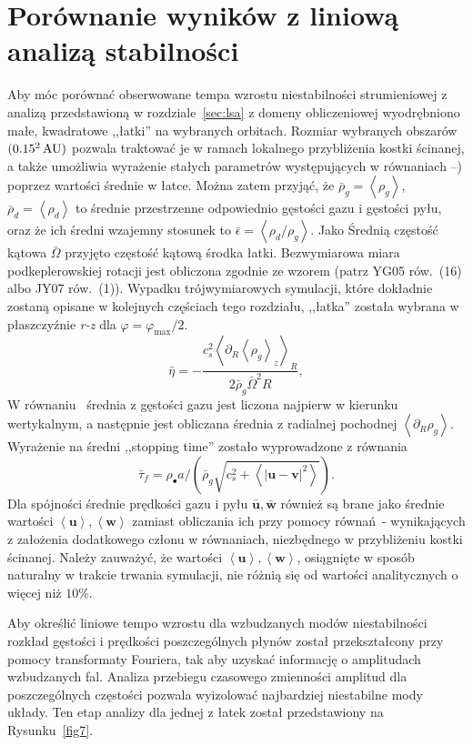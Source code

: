 \section{Porównanie wyników z liniową analizą stabilności}
Aby móc porównać obserwowane tempa wzrostu niestabilności strumieniowej z
analizą przedstawioną w rozdziale~\ref{sec:lsa} z domeny obliczeniowej
wyodrębniono małe, kwadratowe ,,łatki'' na wybranych orbitach. Rozmiar wybranych
obszarów $(0.15^2\hbox{$\thinspace\textrm{AU}$})$ pozwala traktować je w ramach lokalnego przybliżenia
kostki ścinanej, a także umożliwia wyrażenie stałych parametrów występujących w
równaniach --) poprzez wartości średnie w łatce.
Można zatem przyjąć, że $\bar{\rho}_g = \left<\rho_g\right>$, $\bar{\rho}_d =
\left<\rho_d\right>$ to średnie przestrzenne odpowiednio gęstości gazu i
gęstości pyłu, oraz że ich średni wzajemny stosunek to $\bar{\epsilon} =
\left<\rho_d / \rho_g\right>$. Jako Średnią częstość kątowa $\bar{\Omega}$
przyjęto częstość kątową środka łatki. Bezwymiarowa miara podkeplerowskiej
rotacji jest obliczona zgodnie ze wzorem (patrz YG05 rów.~(16) albo JY07
rów.~(1)).  Wypadku trójwymiarowych symulacji, które dokładnie zostaną opisane
w kolejnych częściach tego rozdziału, ,,łatka'' została wybrana w
płaszczyźnie {\it r-z} dla $\varphi = \varphi_\textrm{max} / 2$.
%
\begin{equation}
   \bar{\eta} = -\frac{c_s^2\left<\partial_R \left<\rho_g\right>_z\right>_R}
      {2\bar{\rho}_g\bar{\Omega}^2 R},
   \label{eq:eta}
\end{equation}
%
W równaniu~ średnia z gęstości gazu jest liczona najpierw w
kierunku wertykalnym, a następnie jest obliczana średnia z radialnej pochodnej 
$\left<\partial_R \rho_g\right>$. Wyrażenie na średni ,,stopping time'' zostało
wyprowadzone z równania~
\begin{equation}
   \bar{\tau}_f = \rho_\bullet a / \left(\bar{\rho}_g \sqrt{c_s^2 +
   \left<\left|\mathbf{u} - \mathbf{v}\right|^2\right>} \right).
\end{equation}
%
Dla spójności średnie prędkości gazu i pyłu $\bar{\mathbf{u}},
\bar{\mathbf{w}}$ również są brane jako średnie wartości
$\left<\mathbf{u}\right>, \left<\mathbf{w}\right>$ zamiast obliczania ich przy
pomocy równań~- wynikających z założenia dodatkowego
członu w równaniach, niezbędnego w przybliżeniu kostki ścinanej. 
Należy zauważyć, że wartości $\left<\mathbf{u}\right>, \left<\mathbf{w}\right>$,
osiągnięte w sposób naturalny w trakcie trwania symulacji, nie różnią się od
wartości analitycznych o więcej niż $10\%$.
\par Aby określić liniowe tempo wzrostu dla wzbudzanych modów niestabilności
rozkład gęstości i prędkości poszczególnych płynów został przekształcony przy
pomocy transformaty Fouriera, tak aby uzyskać informację o amplitudach
wzbudzanych fal. Analiza przebiegu czasowego zmienności amplitud dla
poszczególnych częstości pozwala wyizolować najbardziej niestabilne mody układy.
Ten etap analizy dla jednej z łatek został przedstawiony na Rysunku~\ref{fig7}.

